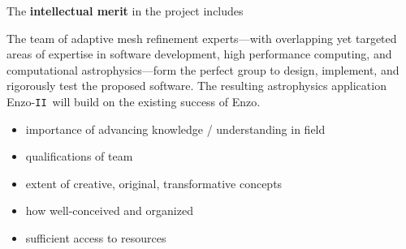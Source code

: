 \documentclass[11pt,letterpaper]{article}
\newcommand{\enzo}{\textsf{Enzo}}
\newcommand{\enzoii}{\textsf{Enzo}-\texttt{II}}
\newcommand{\pp}{\texttt{++}}
\newcommand{\charm}{\textsf{Charm\pp}}
\begin{document}

% 

The \textbf{intellectual merit} in the project includes 
%

The team of adaptive mesh refinement experts---with overlapping yet
targeted areas of expertise in software development, high performance
computing, and computational astrophysics---form the perfect group to
design, implement, and rigorously test the proposed software.  The
resulting astrophysics application \enzoii\ will build on the existing
success of \enzo.


\begin{itemize}
\item importance of advancing knowledge / understanding in field
\item qualifications of team
\item extent of creative, original, transformative concepts
\item how well-conceived and organized
\item sufficient access to resources
\end{itemize}
\end{document}
